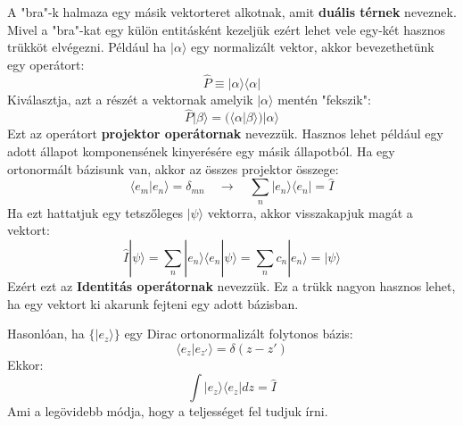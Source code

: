 \documentclass[../main.tex]{subfiles}
\begin{document}
A "bra"-k halmaza egy másik vektorteret alkotnak, amit \textbf{duális térnek} neveznek. Mivel a "bra"-kat egy külön entitásként kezeljük ezért lehet vele egy-két hasznos trükköt elvégezni. 
Például ha $|\alpha \rangle$ egy normalizált vektor, akkor bevezethetünk egy operátort:
\begin{equation}
    \hat{P} \equiv |\alpha \rangle \langle \alpha |
\end{equation}
Kiválasztja, azt a részét a vektornak amelyik $|\alpha \rangle$ mentén "fekszik":
\begin{equation}
    \hat{P} |\beta \rangle = (\langle \alpha | \beta \rangle) |\alpha \rangle
\end{equation}
Ezt az operátort \textbf{projektor operátornak} nevezzük. Hasznos lehet például egy adott állapot komponensének kinyerésére egy másik állapotból. Ha egy ortonormált bázisunk van, akkor az összes projektor összege:
\begin{equation}
    \langle e_m | e_n \rangle = \delta_{mn} \quad \rightarrow \quad \boxed{\sum_n |e_n \rangle \langle e_n | = \hat{I}}
\end{equation}
Ha ezt hattatjuk egy tetszőleges $|\psi \rangle$ vektorra, akkor visszakapjuk magát a vektort:
\begin{equation}
    \hat{I} |\psi \rangle = \sum_n |e_n \rangle \langle e_n | \psi \rangle = \sum_n c_n |e_n \rangle = |\psi \rangle
\end{equation}
Ezért ezt az \textbf{Identitás operátornak} nevezzük. Ez a trükk nagyon hasznos lehet, ha egy vektort ki akarunk fejteni egy adott bázisban.

Hasonlóan, ha $\{|e_z \rangle\}$ egy Dirac ortonormalizált folytonos bázis:
\begin{equation}
    \langle e_{z} | e_{z'} \rangle = \delta(z - z')
\end{equation}
Ekkor:
\begin{equation}
    \boxed{\int |e_{z} \rangle \langle e_{z} | dz = \hat{I}}
\end{equation}
Ami a legövidebb módja, hogy a teljességet fel tudjuk írni.
\end{document}
